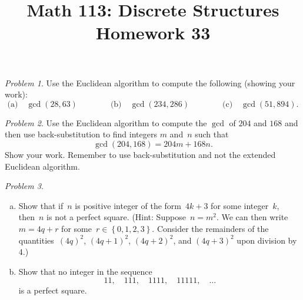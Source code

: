 \documentclass[11pt,twoside]{amsart}
\title{Math 113: Discrete Structures\\ Homework 33}
\theoremstyle{plain}
\theoremstyle{remark}
\newtheorem{prob}{Problem}
\theoremstyle{definition}
\theoremstyle{definition}
\begin{document}
\maketitle




\begin{prob}  Use the Euclidean algorithm to compute the following (showing your work):
\[
  \text{(a)}\quad
  \gcd(28,63)\qquad\qquad\text{(b)}\quad\gcd(234,286)\qquad\qquad\text{(c)}\quad\gcd(51,894).
\]
\end{prob}
\medskip

\begin{prob}
Use the Euclidean algorithm to compute the $\gcd$ of $204$ and $168$ and then
use back-substitution to find
integers $m$ and~$n$ such that
\[
  \gcd(204,168) = 204m+168n.
\]
Show your work.  Remember to use back-substitution and not the extended
Euclidean algorithm.
\end{prob}
\medskip

\begin{prob} 
  \ 
  \begin{enumerate}[(a)]
    \item Show that if~$n$ is positive integer of the form~$4k+3$ for some
      integer~$k$, then~$n$ is not a perfect square. (Hint: Suppose~$n=m^2$.  We
      can then write~$m=4q+r$ for some~$r\in\left\{ 0,1,2,3 \right\}$.  Consider
    the remainders of the quantities~$(4q)^2$, $(4q+1)^2$,
    $(4q+2)^2$, and $(4q+3)^2$ upon division by~$4$.)
  \item Show that no integer in the sequence
    \[
      11,\quad 111,\quad 1111,\quad 11111,\quad \dots
    \]
    is a perfect square. 
  \end{enumerate}
\end{prob}
\end{document}

